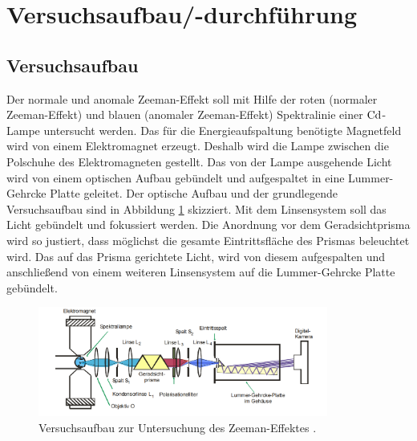 \section{Versuchsaufbau/-durchführung}

\subsection{Versuchsaufbau}

Der normale und anomale Zeeman-Effekt soll mit Hilfe der roten (normaler Zeeman-Effekt)
und blauen (anomaler Zeeman-Effekt) Spektralinie einer $\ce{Cd}$-Lampe untersucht werden.
Das für die Energieaufspaltung benötigte Magnetfeld wird von einem Elektromagnet erzeugt.
Deshalb wird die Lampe zwischen die Polschuhe des Elektromagneten gestellt.
Das von der Lampe ausgehende Licht wird von einem optischen Aufbau gebündelt und aufgespaltet
in eine Lummer-Gehrcke Platte geleitet. Der optische Aufbau und der grundlegende Versuchsaufbau
sind in Abbildung \ref{fig: versuchsaufbau} skizziert.
Mit dem Linsensystem soll das Licht gebündelt und fokussiert werden. Die Anordnung vor dem
Geradsichtprisma wird so justiert, dass möglichst die gesamte Eintrittsfläche des Prismas
beleuchtet wird.
Das auf das Prisma gerichtete Licht, wird von diesem aufgespalten und anschließend von einem
weiteren Linsensystem auf die Lummer-Gehrcke Platte gebündelt.
\FloatBarrier
\begin{figure}[h]
  \centering
  \includegraphics[width=0.85\textwidth]{pics/versuchsaufbau.png}
  \caption{Versuchsaufbau zur Untersuchung des Zeeman-Effektes \cite{anleitung27}.}
  \label{fig: versuchsaufbau}
\end{figure}
\FloatBarrier

